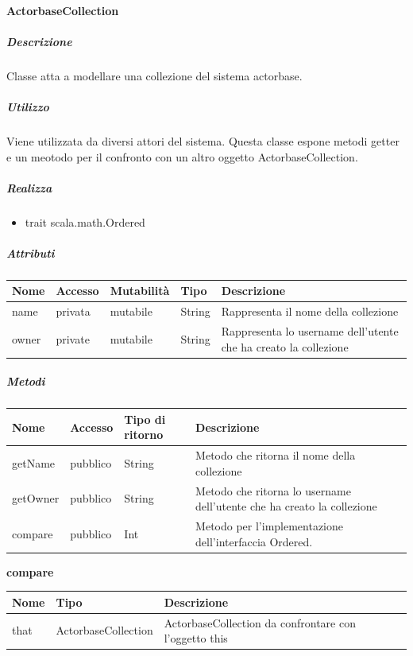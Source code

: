 \documentclass{scalatekids-article}
\begin{document}

\paragraph{ActorbaseCollection}
\label{sec:actorbase::actorsystem::utils::ActorbaseCollection}

\subparagraph{Descrizione}
Classe atta a modellare una collezione del sistema actorbase.

\subparagraph{Utilizzo}
Viene utilizzata da diversi attori del sistema. Questa classe espone metodi
getter e un meotodo per il confronto con un altro oggetto ActorbaseCollection.

\subparagraph{Realizza}
\begin{itemize}
  \item trait scala.math.Ordered
\end{itemize}

\subparagraph{Attributi}
\begin{tabular}{| p{3cm} | p{1.5cm} | p{2cm} | p{2cm} | p{8.5cm} |}
  \hline
  Nome & Accesso & Mutabilità & Tipo & Descrizione\\
  \hline
  name & privata & mutabile & String & Rappresenta il nome della collezione \\
  \hline
  owner & private & mutabile & String & Rappresenta lo username dell'utente che ha creato la collezione \\
  \hline
\end{tabular}

\subparagraph{Metodi}
\begin{tabular}{| l | l | l | l |}
  \hline
  Nome & Accesso & Tipo di ritorno & Descrizione\\
  \hline
  getName & pubblico & String & Metodo che ritorna il nome della collezione \\
  \hline
  getOwner & pubblico & String & Metodo che ritorna lo username dell'utente che ha creato la collezione \\
  \hline
  compare & pubblico & Int & Metodo per l'implementazione dell'interfaccia Ordered.\\
  \hline
\end{tabular}

\begin{center}
  \textbf{compare}\\
\end{center}
\begin{tabular}{| l | l | l |}
  \hline
  Nome & Tipo & Descrizione\\
  \hline
  that & ActorbaseCollection & ActorbaseCollection da confrontare con l'oggetto this \\
  \hline
\end{tabular}
\end{document}
